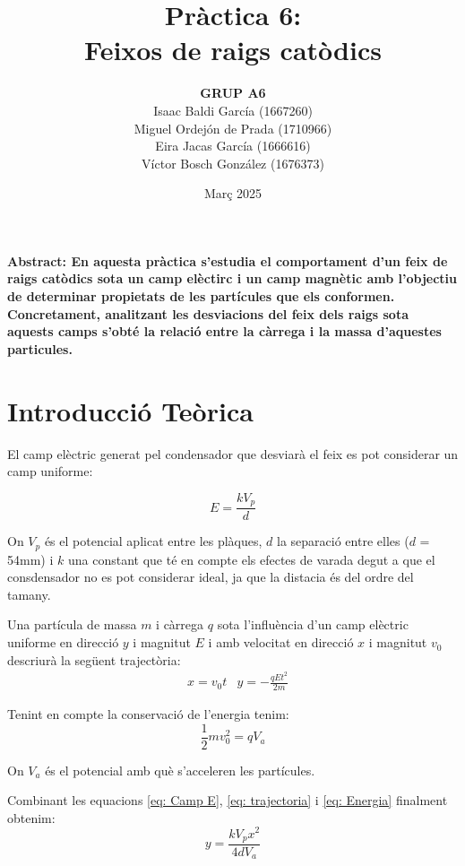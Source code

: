 \documentclass[11pt]{article}
\title{\Huge\bfseries Pràctica 6: \\ Feixos de raigs catòdics \\ [2ex] \Large}
\author{\begin{tabular}{c}
\textbf{GRUP A6} \\
Isaac Baldi García (1667260)\\
Miguel Ordejón de Prada (1710966) \\
Eira Jacas García (1666616) \\
Víctor Bosch González (1676373)
\end{tabular}}
\date{Març 2025}
\begin{document}
\maketitle
\begin{center}
    \textbf{Abstract: En aquesta pràctica s'estudia el comportament d'un feix de raigs catòdics sota un camp elèctirc i un camp magnètic amb l'objectiu de determinar propietats de les partícules que els conformen. Concretament, analitzant les desviacions del feix dels raigs sota aquests camps s'obté la relació entre la càrrega i la massa d'aquestes particules.} 
\end{center}


\newpage

\tableofcontents
\newpage

\section{Introducció Teòrica}

El camp elèctric generat pel condensador que desviarà el feix es pot considerar un camp uniforme:

\begin{equation}
    E = \frac{kV_p}{d}
    \label{eq: Camp E}
\end{equation}

On $V_p$ és el potencial aplicat entre les plàques, $d$ la separació entre elles ($d$ = 54mm) i $k$ una constant que té en compte els efectes de varada degut a que el consdensador no es pot considerar ideal, ja que la distacia és del ordre del tamany.

Una partícula de massa $m$ i càrrega $q$ sota l'influència d'un camp elèctric uniforme en direcció $y$ i magnitut $E$ i amb velocitat en direcció $x$ i magnitut $v_0$ descriurà la següent trajectòria:
\begin{align}
    &x = v_0 t      &y = -\frac{qEt^2}{2m}
    \label{eq: trajectoria}
\end{align}

Tenint en compte la conservació de l'energia tenim:
\begin{equation}
    \frac{1}{2}mv_0^2=qV_a
    \label{eq: Energia}
\end{equation}

On $V_a$ és el potencial amb què s'acceleren les partícules.

Combinant les equacions \ref{eq: Camp E}, \ref{eq: trajectoria} i \ref{eq: Energia} finalment obtenim:
\begin{equation}
    y = \frac{kV_px^2}{4dV_a}
    \label{eq: parabola}
\end{equation}
\end{document}
